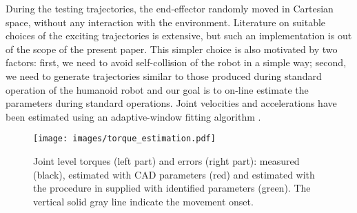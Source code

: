 During the testing trajectories, the end-effector randomly moved in Cartesian space, without any interaction with the environment. Literature on suitable choices of the exciting trajectories is extensive, but such an implementation is out of the scope of the present paper. This simpler choice is also motivated by two factors: first, we need to avoid self-collision of the robot in a simple way; second, we need to generate trajectories similar to those produced during standard operation of the humanoid robot and our goal is to on-line estimate the parameters during standard operations. Joint velocities and accelerations have been estimated using an adaptive-window fitting algorithm \cite{aw2000}. 

%
%

\begin{figure}
 \centering
 \texttt{[image: images/torque\_estimation.pdf]}
 \caption{Joint level torques (left part) and errors (right part): measured (black), estimated with CAD parameters (red) and estimated with the procedure in \cite{Fumagalli2012} supplied with identified parameters (green). The vertical solid gray line indicate the movement onset.}
 \label{fig:torqueEstimation}
\end{figure}

